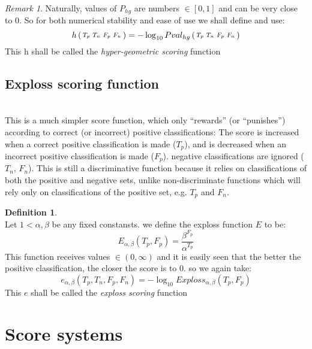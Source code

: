 \documentclass{amsart}
\theoremstyle{definition}
\theoremstyle{remark}
\newtheorem* {loghyge}{Remark}
\theoremstyle{definition}
\newtheorem*{exploss}{Definition}
\theoremstyle{remark}
\begin{document}
\begin {loghyge}
Naturally, values of $P_{hg}$ are numbers $\in [0, 1]$ and can be very close to $0$.
So for both numerical stability and ease of use we shall define and use:
\begin{equation}
h\left(\begin{smallmatrix} T_p & T_n & F_p & F_n \end{smallmatrix}\right) = -\log_{10} Pval_{hg}\left(\begin{smallmatrix} T_p & T_n & F_p & F_n \end{smallmatrix}\right)
\end{equation}
\newline
This h shall be called the \emph{hyper-geometric scoring} function 
\end{loghyge}


\subsection{Exploss scoring function} \mbox {} \\
This is a much simpler score function, 
which only  ``rewards'' (or ``punishes'') according to correct (or incorrect) positive classifications:
The score is increased when a correct positive classification is made ($T_p$), 
and is decreased when an incorrect positive classification is made ($F_p$).
negative classifications are ignored ($T_n$, $F_n$).
This is still a discriminative function because it relies on classifications 
of both the positive and negative sets, unlike non-discriminate
functions which will rely only on classifications of the positive set, e.g. $T_p$ and $F_n$.

\begin{exploss} \mbox {} \\
Let $1 < \alpha,\beta$ be any fixed constansts. 
we define the exploss function $E$ to be:
\begin{equation}
E_{\alpha,\beta} (T_p, F_p) = \frac {\beta^{F_p}}{\alpha^{T_p}}
\end{equation}
\newline
This function receives values $\in (0, \infty)$ and it is easily seen
that the better the positive classification, the closer the score is to $0$.
so we again take:
\begin{equation}
e_{\alpha,\beta} (T_p, T_n, F_p, F_n) = -\log_{10} Exploss_{\alpha,\beta} (T_p, F_p)
\end{equation}
\newline
This $e$ shall be called the \emph{exploss scoring} function 
\end{exploss}

\section{Score systems}
\end{document}
